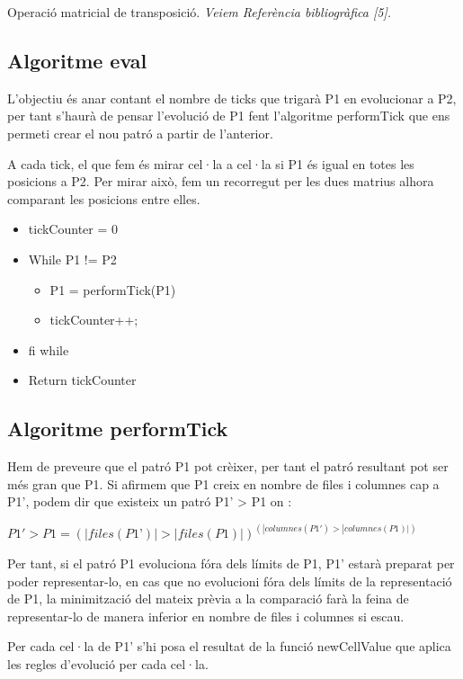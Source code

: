 \documentclass[12pt,a4paper]{report}
\begin{document}
Operació matricial de transposició. \textit{Veiem Referència bibliogràfica [5].}

\subsection{Algoritme eval}

L’objectiu és anar contant el nombre de ticks que trigarà P1 en evolucionar a P2, per tant s’haurà de pensar l’evolució de P1 fent l’algoritme performTick que ens permeti crear el nou patró a partir de l’anterior. 

A cada tick, el que fem és mirar cel·la a cel·la si P1 és igual en totes les posicions a P2. Per mirar això, fem un recorregut per les dues matrius alhora comparant les posicions entre elles.

\begin{itemize}
\item tickCounter = 0
\item While P1 != P2 
	\begin{itemize}
	\item P1 = performTick(P1)
	\item tickCounter++;
	\end{itemize}
\item fi while
\item Return tickCounter
\end{itemize}

\subsection{Algoritme performTick}

Hem de preveure que el patró P1 pot crèixer, per tant el patró resultant pot ser més gran que P1. Si afirmem que P1 creix en nombre de files i columnes cap a P1', podem dir que existeix un patró P1’ > P1 on : 
 
\begin{center}
$P1' > P1 = (|files(P1’)|>|files(P1)|) ^ (|columnes(P1')>|columnes(P1)|)$
\end{center}

Per tant, si el patró P1 evoluciona fóra dels límits de P1, P1’ estarà preparat per poder representar-lo, en cas que no evolucioni fóra dels límits de la representació de P1, la minimització del mateix prèvia a la comparació farà la feina de representar-lo de manera inferior en nombre de files i columnes si escau. 

Per cada cel·la de P1’ s’hi posa el resultat de la funció newCellValue que aplica les regles d’evolució per cada cel·la. 
\end{document}
